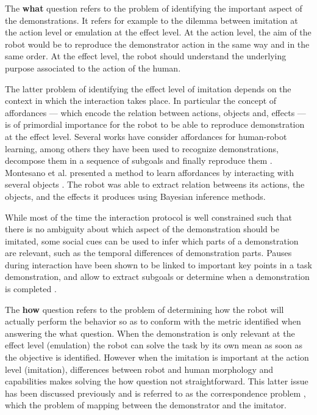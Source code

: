 The \textbf{what} question refers to the problem of identifying the important aspect of the demonstrations. It refers for example to the dilemma between imitation at the action level or emulation at the effect level. At the action level, the aim of the robot would be to reproduce the demonstrator action in the same way and in the same order. At the effect level, the robot should understand the underlying purpose associated to the action of the human. 

The latter problem of identifying the effect level of imitation depends on the context in which the interaction takes place. In particular the concept of affordances \cite{gibson1986ecological} --- which encode the relation between actions, objects and, effects --- is of primordial importance for the robot to be able to reproduce demonstration at the effect level. Several works have consider affordances for human-robot learning, among others they have been used to recognize demonstrations, decompose them in a sequence of subgoals and finally reproduce them \cite{macl07affimit}. Montesano et al. presented a method to learn affordances by interacting with several objects \cite{montesano2008learning}. The robot was able to extract relation betweens its actions, the objects, and the effects it produces using Bayesian inference methods.

While most of the time the interaction protocol is well constrained such that there is no ambiguity about which aspect of the demonstration should be imitated, some social cues can be used to infer which parts of a demonstration are relevant, such as the temporal differences of demonstration parts. Pauses during interaction have been shown to be linked to important key points in a task demonstration, and allow to extract subgoals or determine when a demonstration is completed \cite{theofilis2013temporal}.

The \textbf{how} question refers to the problem of determining how the robot will actually perform the behavior so as to conform with the metric identified when answering the what question. When the demonstration is only relevant at the effect level (emulation) the robot can solve the task by its own mean as soon as the objective is identified. However when the imitation is important at the action level (imitation), differences between robot and human morphology and capabilities makes solving the how question not straightforward. This latter issue has been discussed previously and is referred to as the correspondence problem \cite{nehaniv2002correspondence}, which the problem of mapping between the demonstrator and the imitator.

